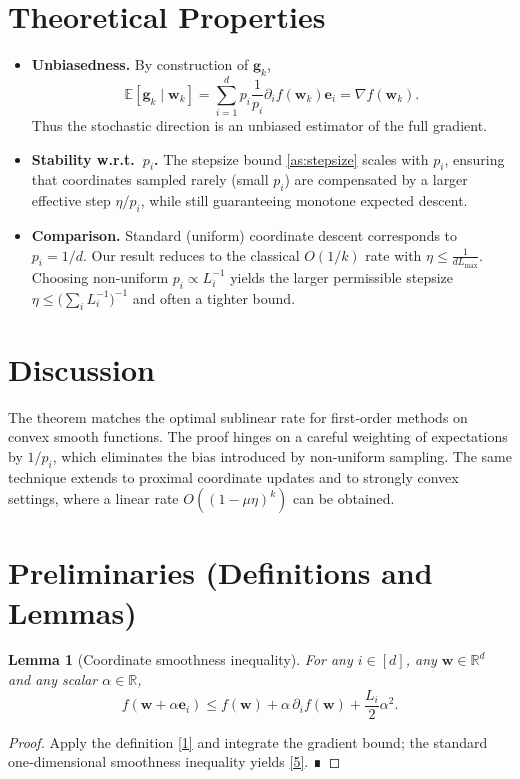 \documentclass{article}
\newtheorem{lemma}{Lemma}
\newcommand{\E}{\mathbb{E}}
\newcommand{\R}{\mathbb{R}}
\newcommand{\grad}{\nabla}
\newcommand{\e}{\mathbf{e}}
\newcommand{\w}{\mathbf{w}}
\newcommand{\g}{\mathbf{g}}
\begin{document}
\section*{Theoretical Properties}
\begin{itemize}[leftmargin=*]
\item \textbf{Unbiasedness.} By construction of $\g_{k}$,
\[
\E[\g_{k}\mid\w_{k}]
= \sum_{i=1}^{d}p_{i}\frac{1}{p_{i}}\partial_{i}f(\w_{k})\e_{i}
= \grad f(\w_{k}).
\]
Thus the stochastic direction is an unbiased estimator of the full gradient.
\item \textbf{Stability w.r.t.\ $p_{i}$.} The stepsize bound \eqref{as:stepsize} scales with $p_{i}$,
ensuring that coordinates sampled rarely (small $p_{i}$) are compensated by a larger
effective step $\eta/p_{i}$, while still guaranteeing monotone expected descent.
\item \textbf{Comparison.} Standard (uniform) coordinate descent corresponds to $p_{i}=1/d$.
Our result reduces to the classical $O(1/k)$ rate with $\eta\le \frac{1}{dL_{\max}}$.
Choosing non‑uniform $p_{i}\propto L_{i}^{-1}$ yields the larger permissible stepsize
$\eta\le \big(\sum_{i}L_{i}^{-1}\big)^{-1}$ and often a tighter bound.
\end{itemize}

\section*{Discussion}
The theorem matches the optimal sublinear rate for first‑order methods on convex smooth functions.
The proof hinges on a careful weighting of expectations by $1/p_{i}$, which eliminates the bias
introduced by non‑uniform sampling. The same technique extends to proximal coordinate updates
and to strongly convex settings, where a linear rate $O((1-\mu\eta)^{k})$ can be obtained.

\newpage
\section*{Preliminaries (Definitions and Lemmas)}
\begin{lemma}[Coordinate smoothness inequality]\label{lem:smooth}
For any $i\in[d]$, any $\w\in\R^{d}$ and any scalar $\alpha\in\R$,
\[
f(\w+\alpha\e_{i})\le f(\w)+\alpha\,\partial_{i}f(\w)+\frac{L_{i}}{2}\alpha^{2}.
\tag{5}
\]
\end{lemma}
\begin{proof}
Apply the definition \eqref{1} and integrate the gradient bound; the standard one‑dimensional
smoothness inequality yields \eqref{5}. ∎
\end{proof}
\end{document}
